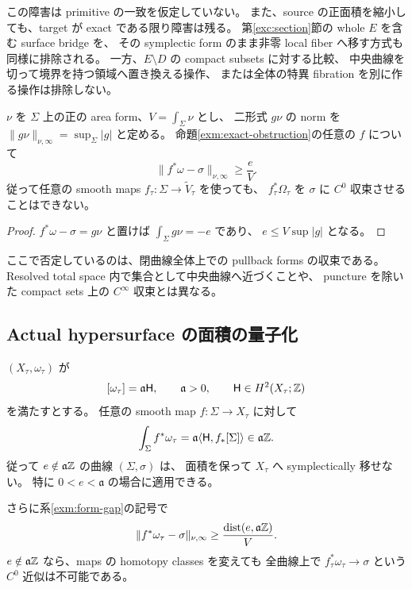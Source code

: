 この障害は primitive の一致を仮定していない。
また、source の正面積を縮小しても、target が exact である限り障害は残る。
第\ref{exc:section}節の whole $E$ を含む surface bridge を、
その symplectic form のまま非零 local fiber へ移す方式も同様に排除される。
一方、$E\setminus D$ の compact subsets に対する比較、
中央曲線を切って境界を持つ領域へ置き換える操作、
または全体の特異 fibration を別に作る操作は排除しない。

\begin{corollary}[全曲線上の形式の近似にも残る下限]
\label{exm:form-gap}
$\nu$ を $\Sigma$ 上の正の area form、$V=\int_\Sigma\nu$ とし、
二形式 $g\nu$ の norm を $\|g\nu\|_{\nu,\infty}=\sup_\Sigma|g|$ と定める。
命題\ref{exm:exact-obstruction}の任意の $f$ について
\[
 \|f^*\omega-\sigma\|_{\nu,\infty}\ge\frac eV.
\]
従って任意の smooth maps $f_\tau:\Sigma\to\widetilde V_\tau$ を使っても、
$f_\tau^*\Omega_\tau$ を $\sigma$ に $C^0$ 収束させることはできない。
\end{corollary}

\begin{proof}
$f^*\omega-\sigma=g\nu$ と置けば $\int_\Sigma g\nu=-e$ であり、
$e\le V\sup|g|$ となる。
\end{proof}

ここで否定しているのは、閉曲線全体上での pullback forms の収束である。
Resolved total space 内で集合として中央曲線へ近づくことや、
puncture を除いた compact sets 上の $C^\infty$ 収束とは異なる。

\subsection{Actual hypersurface の面積の量子化}

\begin{proposition}
\label{exm:quantization}
$(X_\tau,\omega_\tau)$ が
\[
 [\omega_\tau]=\mathfrak a\mathsf H,
 \qquad \mathfrak a>0,
 \qquad \mathsf H\in H^2(X_\tau;\mathbb Z)
\]
を満たすとする。
任意の smooth map $f:\Sigma\to X_\tau$ に対して
\[
 \int_\Sigma f^*\omega_\tau
 =\mathfrak a\langle\mathsf H,f_*[\Sigma]\rangle
 \in\mathfrak a\mathbb Z.
\]
従って $e\notin\mathfrak a\mathbb Z$ の曲線 $(\Sigma,\sigma)$ は、
面積を保って $X_\tau$ へ symplectically 移せない。
特に $0<e<\mathfrak a$ の場合に適用できる。

さらに系\ref{exm:form-gap}の記号で
\[
 \|f^*\omega_\tau-\sigma\|_{\nu,\infty}
 \ge\frac{\operatorname{dist}(e,\mathfrak a\mathbb Z)}V.
\]
$e\notin\mathfrak a\mathbb Z$ なら、maps の homotopy classes を変えても
全曲線上で $f_\tau^*\omega_\tau\to\sigma$ という $C^0$ 近似は不可能である。
\end{proposition}

